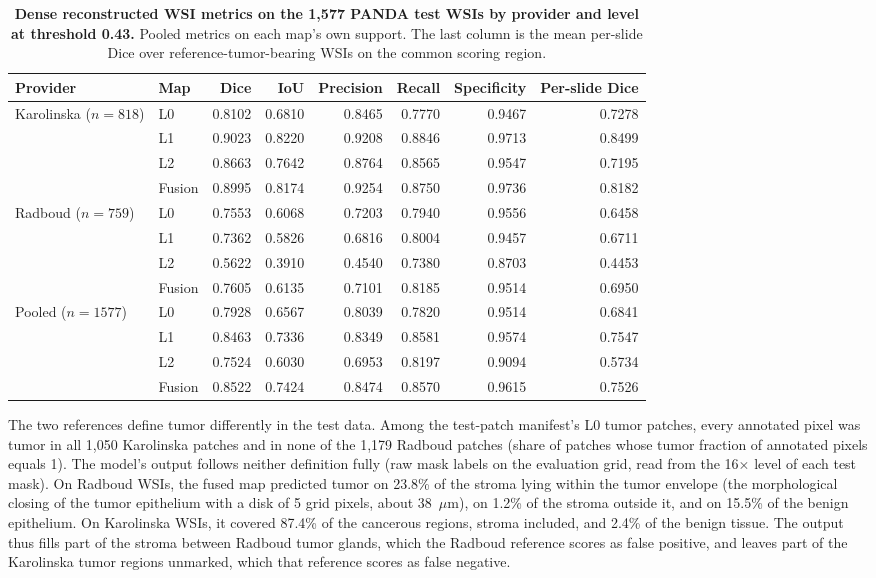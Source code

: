 \documentclass[10pt,letterpaper]{article}
\begin{document}
\begin{table}[H]\begin{adjustwidth}{-2.25in}{0in}\centering\caption{\textbf{Dense reconstructed WSI metrics on the 1,577 PANDA test WSIs by provider and level at threshold 0.43.} Pooled metrics on each map's own support. The last column is the mean per-slide Dice over reference-tumor-bearing WSIs on the common scoring region.}
\begin{tabular}{llrrrrrr}\toprule Provider & Map & Dice & IoU & Precision & Recall & Specificity & Per-slide Dice\\\midrule
Karolinska ($n=818$) & L0 & 0.8102 & 0.6810 & 0.8465 & 0.7770 & 0.9467 & 0.7278\\
 & L1 & 0.9023 & 0.8220 & 0.9208 & 0.8846 & 0.9713 & 0.8499\\
 & L2 & 0.8663 & 0.7642 & 0.8764 & 0.8565 & 0.9547 & 0.7195\\
 & Fusion & 0.8995 & 0.8174 & 0.9254 & 0.8750 & 0.9736 & 0.8182\\
\midrule
Radboud ($n=759$) & L0 & 0.7553 & 0.6068 & 0.7203 & 0.7940 & 0.9556 & 0.6458\\
 & L1 & 0.7362 & 0.5826 & 0.6816 & 0.8004 & 0.9457 & 0.6711\\
 & L2 & 0.5622 & 0.3910 & 0.4540 & 0.7380 & 0.8703 & 0.4453\\
 & Fusion & 0.7605 & 0.6135 & 0.7101 & 0.8185 & 0.9514 & 0.6950\\
\midrule
Pooled ($n=1577$) & L0 & 0.7928 & 0.6567 & 0.8039 & 0.7820 & 0.9514 & 0.6841\\
 & L1 & 0.8463 & 0.7336 & 0.8349 & 0.8581 & 0.9574 & 0.7547\\
 & L2 & 0.7524 & 0.6030 & 0.6953 & 0.8197 & 0.9094 & 0.5734\\
 & Fusion & 0.8522 & 0.7424 & 0.8474 & 0.8570 & 0.9615 & 0.7526\\
\bottomrule\end{tabular}\label{tab:wsi}\end{adjustwidth}\end{table}

The two references define tumor differently in the test data. Among the test-patch manifest's L0 tumor patches, every annotated pixel was tumor in all 1,050 Karolinska patches and in none of the 1,179 Radboud patches (share of patches whose tumor fraction of annotated pixels equals 1). The model's output follows neither definition fully (raw mask labels on the evaluation grid, read from the 16$\times$ level of each test mask). On Radboud WSIs, the fused map predicted tumor on 23.8\% of the stroma lying within the tumor envelope (the morphological closing of the tumor epithelium with a disk of 5 grid pixels, about 38~$\mu$m), on 1.2\% of the stroma outside it, and on 15.5\% of the benign epithelium. On Karolinska WSIs, it covered 87.4\% of the cancerous regions, stroma included, and 2.4\% of the benign tissue. The output thus fills part of the stroma between Radboud tumor glands, which the Radboud reference scores as false positive, and leaves part of the Karolinska tumor regions unmarked, which that reference scores as false negative.
\end{document}
